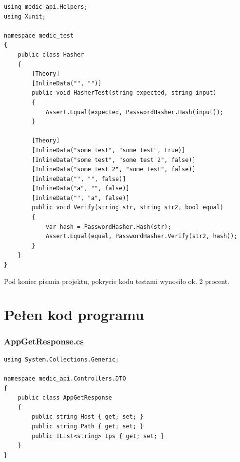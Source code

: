 \documentclass[12pt,a4paper]{article}
\begin{document}
		\begin{lstlisting}
using medic_api.Helpers;
using Xunit;

namespace medic_test
{
    public class Hasher
    {
        [Theory]
        [InlineData("", "")]
        public void HasherTest(string expected, string input)
        {
            Assert.Equal(expected, PasswordHasher.Hash(input));
        }

        [Theory]
        [InlineData("some test", "some test", true)]
        [InlineData("some test", "some test 2", false)]
        [InlineData("some test 2", "some test", false)]
        [InlineData("", "", false)]
        [InlineData("a", "", false)]
        [InlineData("", "a", false)]
        public void Verify(string str, string str2, bool equal)
        {
            var hash = PasswordHasher.Hash(str);
            Assert.Equal(equal, PasswordHasher.Verify(str2, hash));
        }
    }
}
	\end{lstlisting}
	
	Pod koniec pisania projektu, pokrycie kodu testami wynosiło ok. 2 procent.
	
	\newpage
	\section*{Pełen kod programu}
	\subsubsection{AppGetResponse.cs}
	\begin{lstlisting}
using System.Collections.Generic;

namespace medic_api.Controllers.DTO
{
    public class AppGetResponse
    {
        public string Host { get; set; }
        public string Path { get; set; }
        public IList<string> Ips { get; set; }
    }
}
	\end{lstlisting}
\end{document}
